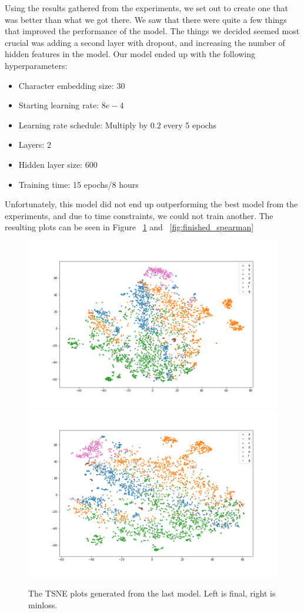 Using the results gathered from the experiments, we set out to create one that was better than what we got there. We saw that there were quite a few things that improved the performance of the model. The things we decided seemed most crucial was adding a second layer with dropout, and increasing the number of hidden features in the model. Our model ended up with the following hyperparameters:
\begin{itemize}
    \item Character embedding size: 30
    \item Starting learning rate: $8e-4$
    \item Learning rate schedule: Multiply by $0.2$ every 5 epochs
    \item Layers: 2
    \item Hidden layer size: $600$
    \item Training time: 15 epochs/8 hours
\end{itemize}
Unfortunately, this model did not end up outperforming the best model from the experiments, and due to time constraints, we could not train another. The resulting plots can be seen in Figure ~\ref{fig:finished_tsne} and ~\ref{fig:finished_spearman}

\begin{figure}[!ht]
  \centering
  \includegraphics[width=0.49\linewidth]{latex/imgs/finished_tsne_final.png}
  \includegraphics[width=0.49\linewidth]{latex/imgs/finished_tsne_minloss.png}
  \caption{The TSNE plots generated from the last model. Left is final, right is minloss.}
  \label{fig:finished_tsne}
\end{figure}

